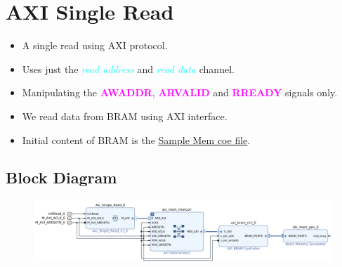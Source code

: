 \documentclass{article}
\newcommand{\chFormat}[1]{\emph{\textcolor{cyan}{#1}}}
\newcommand{\AXISignals}[1]{\textbf{\textcolor{magenta}{#1}}}
\begin{document}
\section{AXI Single Read}
\begin{itemize}
    \item A single read using AXI protocol.
    \item Uses just the \chFormat{read address} and \chFormat{read data} channel.
    \item Manipulating the \AXISignals{AWADDR}, \AXISignals{ARVALID} and \AXISignals{RREADY} signals only.
    \item We read data from BRAM using AXI interface.
    \item Initial content of BRAM is the \href{./MemFiles/SampleMemFile.coe}{Sample Mem coe file}.
\end{itemize}
\subsection{Block Diagram}
\begin{figure}[H]
    \centering
    \includegraphics[width=1\textwidth]{Resources/SingleReadBRAM.png}
\end{figure}
\end{document}
